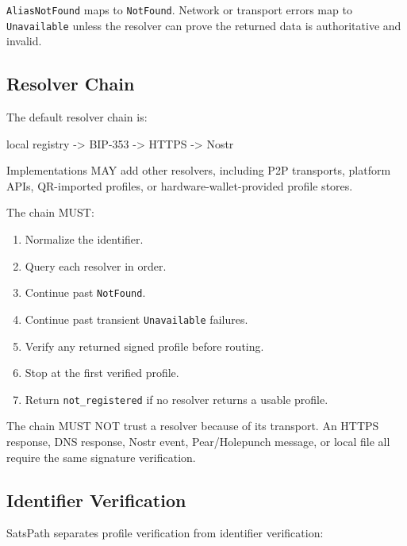 \documentclass[
]{article}
\newenvironment{Shaded}{}{}
\newcommand{\NormalTok}[1]{#1}
\providecommand{\tightlist}{%
  \setlength{\itemsep}{0pt}\setlength{\parskip}{0pt}}
\begin{document}
\texttt{AliasNotFound} maps to \texttt{NotFound}. Network or transport
errors map to \texttt{Unavailable} unless the resolver can prove the
returned data is authoritative and invalid.

\hypertarget{resolver-chain}{%
\subsection{Resolver Chain}\label{resolver-chain}}

The default resolver chain is:

\begin{Shaded}
\begin{Highlighting}[]
\NormalTok{local registry {-}\textgreater{} BIP{-}353 {-}\textgreater{} HTTPS {-}\textgreater{} Nostr}
\end{Highlighting}
\end{Shaded}

Implementations MAY add other resolvers, including P2P transports,
platform APIs, QR-imported profiles, or hardware-wallet-provided profile
stores.

The chain MUST:

\begin{enumerate}
\def\labelenumi{\arabic{enumi}.}
\tightlist
\item
  Normalize the identifier.
\item
  Query each resolver in order.
\item
  Continue past \texttt{NotFound}.
\item
  Continue past transient \texttt{Unavailable} failures.
\item
  Verify any returned signed profile before routing.
\item
  Stop at the first verified profile.
\item
  Return \texttt{not\_registered} if no resolver returns a usable
  profile.
\end{enumerate}

The chain MUST NOT trust a resolver because of its transport. An HTTPS
response, DNS response, Nostr event, Pear/Holepunch message, or local
file all require the same signature verification.

\hypertarget{identifier-verification}{%
\subsection{Identifier Verification}\label{identifier-verification}}

SatsPath separates profile verification from identifier verification:
\end{document}
